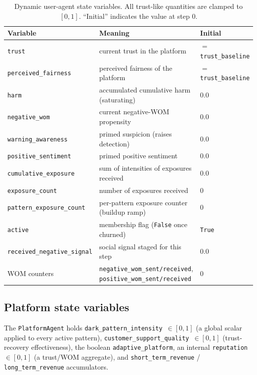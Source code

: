 \documentclass[11pt]{article}
\newcommand{\code}[1]{\texttt{#1}}
\begin{document}
\begin{table}[!ht]
\centering
\caption{Dynamic user-agent state variables. All trust-like quantities are
clamped to $[0,1]$. ``Initial'' indicates the value at step 0.}
\label{tab:dynamic}
\small
\begin{tabular}{lll}
\toprule
Variable & Meaning & Initial \\
\midrule
\code{trust}                 & current trust in the platform                  & $=$\,\code{trust\_baseline} \\
\code{perceived\_fairness}   & perceived fairness of the platform             & $=$\,\code{trust\_baseline} \\
\code{harm}                  & accumulated cumulative harm (saturating)       & $0.0$ \\
\code{negative\_wom}         & current negative-WOM propensity                & $0.0$ \\
\code{warning\_awareness}    & primed suspicion (raises detection)            & $0.0$ \\
\code{positive\_sentiment}   & primed positive sentiment                      & $0.0$ \\
\code{cumulative\_exposure}  & sum of intensities of exposures received       & $0.0$ \\
\code{exposure\_count}       & number of exposures received                   & $0$ \\
\code{pattern\_exposure\_count} & per-pattern exposure counter (buildup ramp) & $0$ \\
\code{active}                & membership flag (\code{False} once churned)    & \code{True} \\
\code{received\_negative\_signal} & social signal staged for this step        & $0.0$ \\
WOM counters                 & \code{negative\_wom\_sent/received}, \code{positive\_wom\_sent/received} & $0$ \\
\bottomrule
\end{tabular}
\end{table}

\subsection{Platform state variables}

The \code{PlatformAgent} holds \code{dark\_pattern\_intensity}~$\in[0,1]$
(a global scalar applied to every active pattern),
\code{customer\_support\_quality}~$\in[0,1]$ (trust-recovery effectiveness),
the boolean \code{adaptive\_platform}, an internal \code{reputation}~$\in[0,1]$
(a trust/WOM aggregate), and \code{short\_term\_revenue} /
\code{long\_term\_revenue} accumulators.
\end{document}
